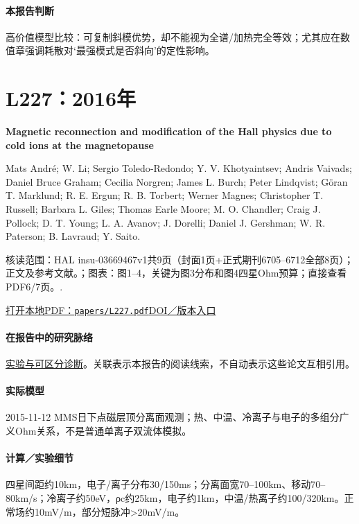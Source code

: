 \paragraph{本报告判断}高价值模型比较：可复制斜模优势，却不能视为全谱/加热完全等效；尤其应在数值章强调耗散对‘最强模式是否斜向’的定性影响。

\section{L227：2016年}\label{paper:L227}

\textbf{Magnetic reconnection and modification of the Hall physics due to cold ions at the magnetopause}\citep{L227}\

Mats André;  W. Li;  Sergio Toledo‐Redondo;  Y. V. Khotyaintsev;  Andris Vaivads;  Daniel Bruce Graham;  Cecilia Norgren;  James L. Burch;  Peter Lindqvist;  Göran T. Marklund;  R. E. Ergun;  R. B. Torbert;  Werner Magnes;  Christopher T. Russell;  Barbara L. Giles;  Thomas Earle Moore;  M. O. Chandler;  Craig J. Pollock;  D. T. Young;  L. A. Avanov;  J. Dorelli;  Daniel J. Gershman;  W. R. Paterson;  B. Lavraud;  Y. Saito.

\textsf{核读范围：}HAL insu-03669467v1共9页（封面1页+正式期刊6705–6712全部8页）；正文及参考文献。；\textsf{图表：}图1–4，关键为图3分布和图4四星Ohm预算；直接查看PDF6/7页。.

\href{run:papers/L227.pdf}{打开本地PDF：\texttt{papers/L227.pdf}}\quad\href{https://doi.org/10.1002/2016gl069665}{DOI／版本入口}

\paragraph{在报告中的研究脉络}\hyperref[story:diagnostic]{实验与可区分诊断}。关联表示本报告的阅读线索，不自动表示这些论文互相引用。

\paragraph{实际模型}2015-11-12 MMS日下点磁层顶分离面观测；热、中温、冷离子与电子的多组分广义Ohm关系，不是普通单离子双流体模拟。

\paragraph{计算／实验细节}四星间距约10km，电子/离子分布30/150ms；分离面宽70–100km、移动70–80km/s；冷离子约50eV，ρc约25km，电子约1km，中温/热离子约100/320km。正常场约10mV/m，部分短脉冲>20mV/m。

